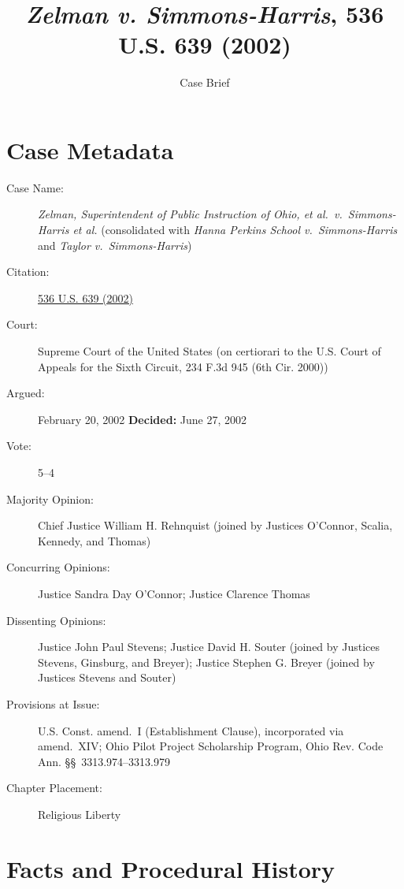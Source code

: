 \documentclass[12pt]{article}
\title{\textit{Zelman v. Simmons-Harris}, 536 U.S. 639 (2002)}
\author{Case Brief}
\date{}
\begin{document}
\maketitle


\section{Case Metadata}

\begin{description}
  \item[Case Name:] \emph{Zelman, Superintendent of Public Instruction of Ohio, et al.\ v.\ Simmons-Harris et al.} (consolidated with \emph{Hanna Perkins School v.\ Simmons-Harris} and \emph{Taylor v.\ Simmons-Harris})
  \item[Citation:] \href{https://supreme.justia.com/cases/federal/us/536/639/}{536 U.S. 639 (2002)}
  \item[Court:] Supreme Court of the United States (on certiorari to the U.S. Court of Appeals for the Sixth Circuit, 234 F.3d 945 (6th Cir. 2000))
  \item[Argued:] February 20, 2002 \quad \textbf{Decided:} June 27, 2002
  \item[Vote:] 5--4
  \item[Majority Opinion:] Chief Justice William H. Rehnquist (joined by Justices O'Connor, Scalia, Kennedy, and Thomas)
  \item[Concurring Opinions:] Justice Sandra Day O'Connor; Justice Clarence Thomas
  \item[Dissenting Opinions:] Justice John Paul Stevens; Justice David H. Souter (joined by Justices Stevens, Ginsburg, and Breyer); Justice Stephen G. Breyer (joined by Justices Stevens and Souter)
  \item[Provisions at Issue:] U.S. Const. amend.~I (Establishment Clause), incorporated via amend.~XIV; Ohio Pilot Project Scholarship Program, Ohio Rev. Code Ann. \S\S~3313.974--3313.979
  \item[Chapter Placement:] Religious Liberty
\end{description}

\section{Facts and Procedural History}
\end{document}
